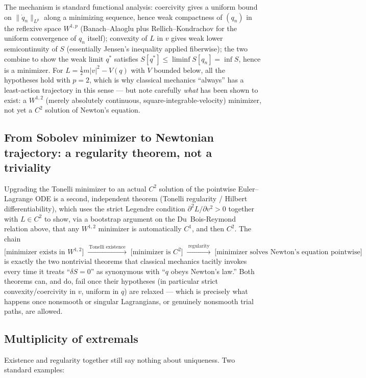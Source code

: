 \documentclass[11pt]{article}
\begin{document}
The mechanism is standard functional analysis: coercivity gives a uniform bound on $\|\dot q_n\|_{L^p}$ along a minimizing sequence, hence weak compactness of $(q_n)$ in the reflexive space $W^{1,p}$ (Banach--Alaoglu plus Rellich--Kondrachov for the uniform convergence of $q_n$ itself); convexity of $L$ in $v$ gives weak lower semicontinuity of $S$ (essentially Jensen's inequality applied fiberwise); the two combine to show the weak limit $q^\ast$ satisfies $S[q^\ast]\le \liminf S[q_n] = \inf S$, hence is a minimizer. For $L=\tfrac12 m|v|^2 - V(q)$ with $V$ bounded below, all the hypotheses hold with $p=2$, which is why classical mechanics ``always'' has a least-action trajectory in this sense --- but note carefully \emph{what} has been shown to exist: a $W^{1,2}$ (merely absolutely continuous, square-integrable-velocity) minimizer, not yet a $C^2$ solution of Newton's equation.

\subsection{From Sobolev minimizer to Newtonian trajectory: a regularity theorem, not a triviality}

Upgrading the Tonelli minimizer to an actual $C^2$ solution of the pointwise Euler--Lagrange ODE is a second, independent theorem (Tonelli regularity / Hilbert differentiability), which uses the strict Legendre condition $\partial^2 L/\partial v^2 > 0$ together with $L\in C^2$ to show, via a bootstrap argument on the Du~Bois-Reymond relation above, that any $W^{1,2}$ minimizer is automatically $C^1$, and then $C^2$. The chain
\[
\text{[minimizer exists in } W^{1,2}\text{]} \;\xrightarrow{\ \text{Tonelli existence}\ }\; \text{[minimizer is }C^2\text{]} \;\xrightarrow{\ \text{regularity}\ }\; \text{[minimizer solves Newton's equation pointwise]}
\]
is exactly the two nontrivial theorems that classical mechanics tacitly invokes every time it treats ``$\delta S=0$'' as synonymous with ``$q$ obeys Newton's law.'' Both theorems can, and do, fail once their hypotheses (in particular strict convexity/coercivity in $v$, uniform in $q$) are relaxed --- which is precisely what happens once nonsmooth or singular Lagrangians, or genuinely nonsmooth trial paths, are allowed.

\subsection{Multiplicity of extremals}

Existence and regularity together still say nothing about uniqueness. Two standard examples:
\end{document}
